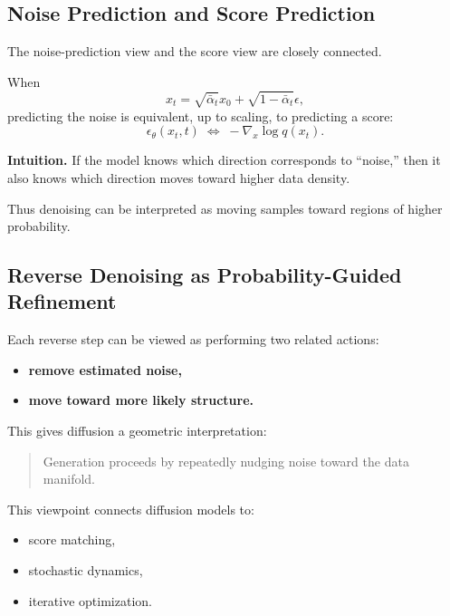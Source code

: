 \subsection{Noise Prediction and Score Prediction}

The noise-prediction view and the score view are closely connected.

\medskip

\noindent
When
\[
x_t = \sqrt{\bar{\alpha}_t}x_0 + \sqrt{1-\bar{\alpha}_t}\epsilon,
\]
predicting the noise is equivalent, up to scaling, to predicting a score:
\[
\epsilon_\theta(x_t,t)
\;\Longleftrightarrow\;
-\nabla_x \log q(x_t).
\]

\medskip

\noindent
\textbf{Intuition.}
If the model knows which direction corresponds to ``noise,'' then it also knows which direction moves toward higher data density.

\medskip

\noindent
Thus denoising can be interpreted as moving samples toward regions of higher probability.

\subsection{Reverse Denoising as Probability-Guided Refinement}

Each reverse step can be viewed as performing two related actions:

\begin{itemize}
    \item \textbf{remove estimated noise,}
    \item \textbf{move toward more likely structure.}
\end{itemize}

\medskip

\noindent
This gives diffusion a geometric interpretation:
\begin{quote}
Generation proceeds by repeatedly nudging noise toward the data manifold.
\end{quote}

\medskip

\noindent
This viewpoint connects diffusion models to:
\begin{itemize}
    \item score matching,
    \item stochastic dynamics,
    \item iterative optimization.
\end{itemize}

